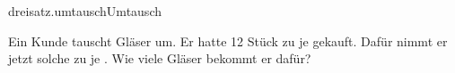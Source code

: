 \begin{exercise}{dreisatz.umtausch}{Umtausch}
  \ifproblem\problem\par
    Ein Kunde tauscht Gläser um. Er hatte 12 Stück zu je  gekauft. Dafür
    nimmt er jetzt solche zu je . Wie viele Gläser bekommt er dafür?
  \fi
\end{exercise}

